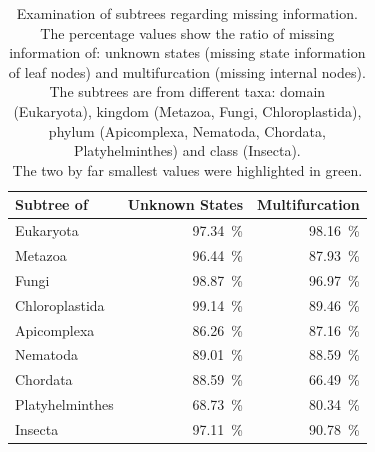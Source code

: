     \begin{table}[h!]
      \begin{center}
        \begin{tabular}{ |l||r|r| }
          \hline
          \bfseries Subtree of & \bfseries Unknown States & \bfseries Multifurcation \\ 
          \hline \hline
          Eukaryota       & 97.34~\%  & 98.16~\% \\
          \hline \hline
          Metazoa         & 96.44~\%  & 87.93~\% \\ \hline
          Fungi           & 98.87~\%  & 96.97~\% \\ \hline
          Chloroplastida  & 99.14~\%  & 89.46~\% \\
          \hline \hline            
          Apicomplexa     & 86.26~\%  & 87.16~\% \\ \hline
          Nematoda        & 89.01~\%  & 88.59~\% \\ \hline
          Chordata        & 88.59~\%  & \cellcolor{green!50}66.49~\% \\ \hline
          Platyhelminthes & \cellcolor{green!50}68.73~\%  & 80.34~\% \\
          \hline \hline            
          Insecta         & 97.11~\%  & 90.78~\% \\
          \hline  
        \end{tabular}
      \end{center}
      \caption{Examination of subtrees regarding missing information. \\
        The percentage values show the ratio of missing information of: unknown states (missing state 
          information of leaf nodes) and multifurcation (missing internal nodes). \\
        The subtrees are from different taxa: domain (Eukaryota), kingdom (Metazoa, Fungi, 
          Chloroplastida), phylum (Apicomplexa, Nematoda, Chordata, Platyhelminthes) and class 
          (Insecta). \\
        The two by far smallest values were highlighted in green.} 
      \label{table:percentage loss information subtrees} 
    \end{table}
    
